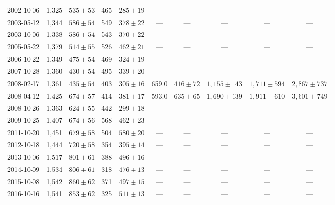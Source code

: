 \begin{landscape}
\begin{longtable}{cccccccccc}
{2002-10-06} & 1,325 & {$535  \pm  53$} & 465 & {$285 \pm 19$} & --- & --- & --- & --- & --- \\
{2003-05-12} & 1,344 & {$586  \pm  54$} & 549 & {$378 \pm 22$} & --- & --- & --- & --- & --- \\
{2003-10-06} & 1,338 & {$586  \pm  54$} & 543 & {$370 \pm 22$} & --- & --- & --- & --- & --- \\
{2005-05-22} & 1,379 & {$514  \pm  55$} & 526 & {$462 \pm 21$} & --- & --- & --- & --- & --- \\
{2006-10-22} & 1,349 & {$475  \pm  54$} & 469 & {$324 \pm 19$} & --- & --- & --- & --- & --- \\
{2007-10-28} & 1,360 & {$430  \pm  54$} & 495 & {$339 \pm 20$} & --- & --- & --- & --- & --- \\
{2008-02-17} & 1,361 & {$435  \pm  54$} & 403 & {$305 \pm 16$} & 659.0 & {$416 \pm 72$} & {$1,155 \pm 143$} & {$1,711 \pm 594$} & {$2,867 \pm 737$} \\
{2008-04-12} & 1,425 & {$674  \pm  57$} & 414 & {$381 \pm 17$} & 593.0 & {$635 \pm 65$} & {$1,690 \pm 139$} & {$1,911 \pm 610$} & {$3,601 \pm 749$} \\
{2008-10-26} & 1,363 & {$624  \pm  55$} & 442 & {$299 \pm 18$} & --- & --- & --- & --- & --- \\
{2009-10-25} & 1,407 & {$674  \pm  56$} & 568 & {$462 \pm 23$} & --- & --- & --- & --- & --- \\
{2011-10-20} & 1,451 & {$679  \pm  58$} & 504 & {$580 \pm 20$} & --- & --- & --- & --- & --- \\
{2012-10-18} & 1,444 & {$720  \pm  58$} & 354 & {$395 \pm 14$} & --- & --- & --- & --- & --- \\
{2013-10-06} & 1,517 & {$801  \pm  61$} & 388 & {$496 \pm 16$} & --- & --- & --- & --- & --- \\
{2014-10-09} & 1,534 & {$806  \pm  61$} & 318 & {$476 \pm 13$} & --- & --- & --- & --- & --- \\
{2015-10-08} & 1,542 & {$860  \pm  62$} & 371 & {$497 \pm 15$} & --- & --- & --- & --- & --- \\
{2016-10-16} & 1,541 & {$853  \pm  62$} & 325 & {$511 \pm 13$} & --- & --- & --- & --- & --- \\
\end{longtable} 
\end{landscape} 

